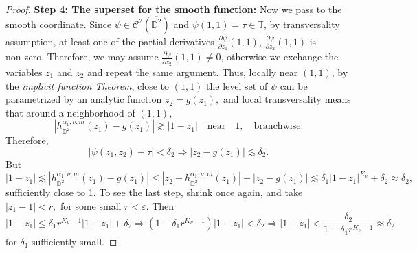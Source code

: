 \documentclass[12pt]{amsart}
\numberwithin{equation}{section}
\begin{document}
\begin{proof}
\textbf{Step 4: The superset for the smooth function:}
Now we pass to the smooth coordinate. Since $\psi \in \mathcal{C}^2(\overline{\mathbb{D}^2})$ and $\psi(1,1)=\tau\in\mathbb{T}$, by transversality assumption, at least one of the partial derivatives $\frac{\partial \psi}{\partial z_1}(1,1)$, $\frac{\partial \psi}{\partial z_2}(1,1)$ is non‑zero. Therefore, we may assume $\frac{\partial \psi}{\partial z_2}(1,1) \neq 0$, otherwise we exchange the variables $z_1$ and $z_2$ and repeat the same argument. Thus, locally near $(1,1)$, by the \textit{implicit function Theorem}, close to $(1,1)$ the level set of $\psi$ can be parametrized by an analytic function $z_2=g(z_1),$ and local transversality means that around a neighborhood of $(1,1),$ $$|h^{\alpha_1,\nu,m}_{\mathbb{D}^2}(z_1)-g(z_1)|\gtrsim |1-z_1|\quad \mathrm{near} \quad 1,\quad \mathrm{branchwise}.$$ Therefore, $$|\psi(z_1,z_2)-\tau|<\delta_2\Longrightarrow|z_2-g(z_1)|\lesssim\delta_2.$$ But
$$|1-z_1|\lesssim|h^{\alpha_1,\nu,m}_{\mathbb{D}^2}(z_1)-g(z_1)|\leq |z_2-h^{\alpha_1,\nu,m}_{\mathbb{D}^2}(z_1)|+|z_2-g(z_1)|\lesssim\delta_1|1-z_1|^{K_\nu}+\delta_2\approx\delta_2,$$ sufficiently close to 1.
To see the last step, shrink once again, and take $|z_1-1|<r,$ for some small $r<\varepsilon.$  Then 
$$|1-z_1|\leq \delta_1r^{K_{\nu}-1}|1-z_1|+\delta_2\Longrightarrow(1-\delta_1r^{K_{\nu}-1})|1-z_1|<\delta_2\Longrightarrow|1-z_1|<\frac{\delta_2}{1-\delta_1r^{K_{\nu}-1}}\approx\delta_2$$
for $\delta_1$ sufficiently small.


\end{proof}
\end{document}
